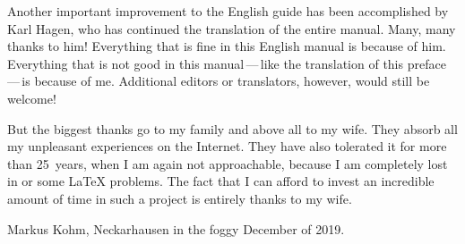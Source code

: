 Another important improvement to the English guide has been accomplished by
Karl Hagen, who has continued the translation of the entire manual. Many, many
thanks to him! Everything that is fine in this English manual is because of
him. Everything that is not good in this manual\,---\,like the translation of
this preface\,---\,is because of me. Additional editors or translators,
however, would still be welcome!

But the biggest thanks go to my family and above all to my wife. They absorb
all my unpleasant experiences on the Internet. They have also tolerated it for
more than 25~years, when I am again not approachable, because I am completely
lost in \KOMAScript{} or some \LaTeX{} problems. The fact that I can afford to
invest an incredible amount of time in such a project is entirely thanks to my
wife.

\bigskip\noindent
Markus Kohm, Neckarhausen in the foggy December of 2019.

\endinput


